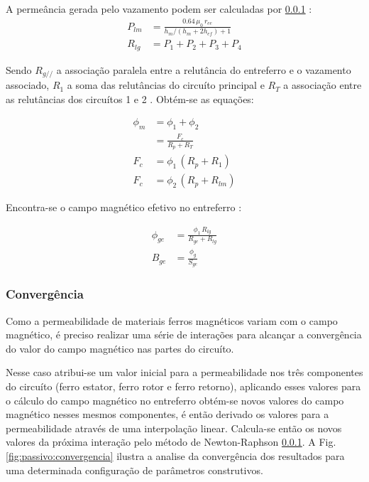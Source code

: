 A permeância gerada pelo vazamento podem ser calculadas por \ref{}  :
\begin{align}
	P_{lm} &= \frac{0.64 \,  \mu_0 \,r_{ee}}{h_m/(h_m+2h_{ef})+1} \\
	R_{lg} &= P_1 + P_2 + P_3 + P_4	
\end{align} 

Sendo $R_{g//}$ a associação paralela entre a relutância do entreferro e o vazamento associado, $R_1$ a soma das relutâncias do circuíto principal e $R_T$ a associação entre as relutâncias dos circuítos 1 e 2 . Obtém-se as equações:

\begin{align}
	\phi_m &= \phi_1 + \phi_2 \\
		   &= \frac{F_c}{R_p + R_T} \\
	F_c	   &= \phi_1 \, (R_p + R_1) \\
	F_c    &= \phi_2 \, (R_p + R_{lm})
\end{align}

Encontra-se o campo magnético efetivo no entreferro :

\begin{align}
   \phi_{ge} &= \frac{\phi_1 \, R_{lg}}{R_{ge}+R_{lg}} \\
   B_{ge} &= \frac{\phi_g}{S_{ge}}
\end{align}

\subsubsection{Convergência}

Como a permeabilidade de materiais ferros magnéticos variam com o campo magnético, é preciso realizar uma série de interações para alcançar a convergência do valor do campo magnético nas partes do circuíto. 

Nesse caso atribui-se um valor inicial para a permeabilidade nos três componentes do circuíto (ferro estator, ferro rotor e ferro retorno), aplicando esses valores para o cálculo do campo magnético no entreferro obtém-se novos valores do campo magnético nesses mesmos componentes, é então derivado os valores para a permeabilidade através de uma interpolação linear. Calcula-se então os novos valores da próxima interação pelo método de Newton-Raphson \ref{}. A Fig. \ref{fig:passivo:convergencia} ilustra a analise da convergência dos resultados para uma determinada configuração de parâmetros construtivos.  


